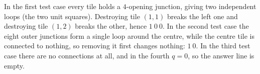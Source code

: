 In the first test case every tile holds a $4$-opening junction, giving two independent loops (the two unit squares). Destroying tile $(1,1)$ breaks the left one and destroying tile $(1,2)$ breaks the other, hence $1\ 0\ 0$. In the second test case the eight outer junctions form a single loop around the centre, while the centre tile is connected to nothing, so removing it first changes nothing: $1\ 0$. In the third test case there are no connections at all, and in the fourth $q = 0$, so the answer line is empty.

